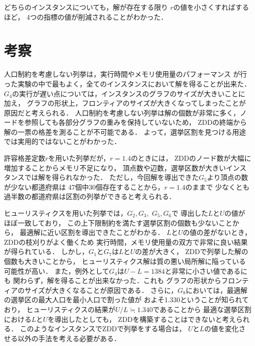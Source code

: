 どちらのインスタンスについても，解が存在する限り
$r$の値を小さくすればするほど，
4つの指標の値が削減されることがわかった．

\section{考察}

人口制約を考慮しない列挙は，実行時間やメモリ使用量のパフォーマンス
が行った実験の中で最もよく，全てのインスタンスにおいて解を得ることが出来た．
$G_4$の実行が遅い点については，インスタンスのグラフのサイズが大きいことに加え，
グラフの形状上，フロンティアのサイズが大きくなってしまったことが原因だと考えられる．
人口制約を考慮しない列挙は解の個数が非常に多く，ノードを参照しても各部分グラフの重みを保持していないため，
ZDDの終端から解の一票の格差を測ることが不可能である．
よって，選挙区割を見つける用途では実用的ではないことがわかった．

許容格差定数$r$を用いた列挙だが，$r=1.4$のときには，
ZDDのノード数が大幅に増加することからメモリ不足になり，
頂点数や辺数，選挙区数が大きいインスタンスでは解を得られなかった．
ただし，今回解を導出できた$G_5$より頂点の数が少ない都道府県は
47個中30個存在することから，$r=1.4$のままで
少なくとも過半数の都道府県は区割の列挙ができると考えられる．

ヒューリスティクスを用いた列挙では，$G_2, G_3,$ $ G_5, G_6$で
導出した$L$と$U$の値がほぼ一致しており，
この上下限制約を満たす選挙区割の個数も少ないことから，
最適解に近い区割を導出できたことがわかる．
$L$と$U$の値の差がないとき，ZDDの枝刈りがよく働くため
実行時間，メモリ使用量の双方で非常に良い結果が得られている．
しかし，$G_1$と$G_7$は$L$と$U$の差が大きく，
ZDDで列挙した解の個数も大きいことから，
ヒューリスティクス解は質の悪い局所解に陥っている可能性が高い．
また，例外として$G_4$は$U-L=1384$と非常に小さい値であるにも
関わらず，解を得ることが出来なかった．これも
グラフの形状からフロンティアのサイズが大きくなることが原因である．
さらに，$G_8$においては，最適解の選挙区の最大人口を最小人口で割った値が
およそ1.330ということが知られており，
ヒューリスティクスの結果が$U/L\fallingdotseq1.340$であることから
最適な選挙区割における$L$と$U$を導出したとしても，
ZDDを構築することはできないと考えられる．
このようなインスタンスでZDDで列挙をする場合は，
$U$と$L$の値を変化させる以外の手法を考える必要がある．
